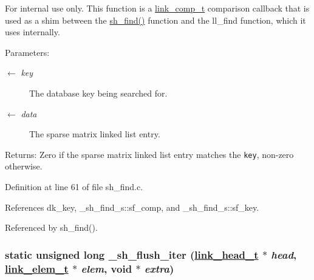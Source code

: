 \begin{Desc}
\item[For internal use only.]
This function is a \hyperlink{group__dbprim__link_ga3}{link\_\-comp\_\-t} comparison callback that is used as a shim between the \hyperlink{group__dbprim__smat_ga20}{sh\_\-find()} function and the ll\_\-find function, which it uses internally.

\begin{Desc}
\item[Parameters:]
\begin{description}
\item[\mbox{$\leftarrow$} {\em key}]The database key being searched for. \item[\mbox{$\leftarrow$} {\em data}]The sparse matrix linked list entry.\end{description}
\end{Desc}
\begin{Desc}
\item[Returns:]Zero if the sparse matrix linked list entry matches the {\tt key}, non-zero otherwise.\end{Desc}
\end{Desc}


Definition at line 61 of file sh\_\-find.c.

References dk\_\-key, \_\-sh\_\-find\_\-s::sf\_\-comp, and \_\-sh\_\-find\_\-s::sf\_\-key.

Referenced by sh\_\-find().\hypertarget{group__dbprim__smat_ga28}{
\subsubsection[\_\-sh\_\-flush\_\-iter]{\setlength{\rightskip}{0pt plus 5cm}static unsigned long \_\-sh\_\-flush\_\-iter (\hyperlink{struct__link__head__s}{link\_\-head\_\-t} $\ast$ {\em head}, \hyperlink{struct__link__elem__s}{link\_\-elem\_\-t} $\ast$ {\em elem}, void $\ast$ {\em extra})}}
\label{group__dbprim__smat_ga28}


